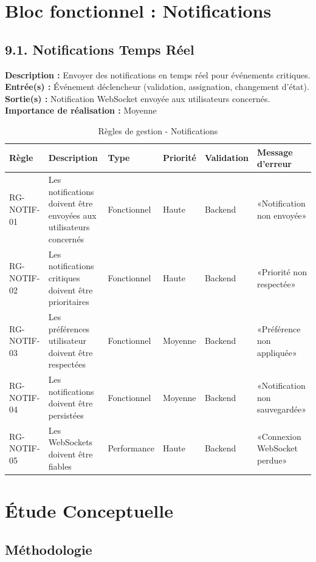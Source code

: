 \section{Bloc fonctionnel : Notifications}

\subsection{9.1. Notifications Temps Réel}
\textbf{Description :} Envoyer des notifications en temps réel pour événements critiques.
\textbf{Entrée(s) :} Événement déclencheur (validation, assignation, changement d'état).
\textbf{Sortie(s) :} Notification WebSocket envoyée aux utilisateurs concernés.
\textbf{Importance de réalisation :} Moyenne

\begin{table}[H]
\centering
\footnotesize
\begin{tabular}{|p{1.5cm}|p{3.5cm}|p{1.5cm}|p{1.5cm}|p{2cm}|p{2.5cm}|}
\hline
\textbf{Règle} & \textbf{Description} & \textbf{Type} & \textbf{Priorité} & \textbf{Validation} & \textbf{Message d'erreur} \\
\hline
RG-NOTIF-01 & Les notifications doivent être envoyées aux utilisateurs concernés & Fonctionnel & Haute & Backend & «Notification non envoyée» \\
\hline
RG-NOTIF-02 & Les notifications critiques doivent être prioritaires & Fonctionnel & Haute & Backend & «Priorité non respectée» \\
\hline
RG-NOTIF-03 & Les préférences utilisateur doivent être respectées & Fonctionnel & Moyenne & Backend & «Préférence non appliquée» \\
\hline
RG-NOTIF-04 & Les notifications doivent être persistées & Fonctionnel & Moyenne & Backend & «Notification non sauvegardée» \\
\hline
RG-NOTIF-05 & Les WebSockets doivent être fiables & Performance & Haute & Backend & «Connexion WebSocket perdue» \\
\hline
\end{tabular}
\caption{Règles de gestion - Notifications}
\label{tab:rg_notifications}
\end{table}

\section{Étude Conceptuelle}

\subsection{Méthodologie}

